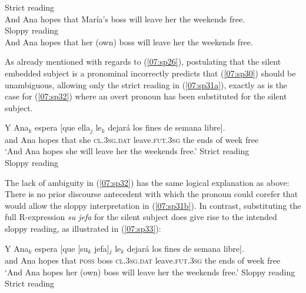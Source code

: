 \documentclass[output=paper,colorlinks,citecolor=brown,draft,draftmode]{langscibook}
\begin{document}
\ea \label{07:sp31}
\ea\label{07:sp31a}\cmark Strict reading\\
And Ana hopes that María’s boss will leave her the weekends free. \\
\ex\label{07:sp31b}\cmark Sloppy reading\\
And Ana hopes that her (own) boss will leave her the weekends free.
\z
\z

As already mentioned with regards to (\ref{07:sp26}), postulating that the silent embedded subject is a pronominal incorrectly predicts that (\ref{07:sp30}) should be unambiguous, allowing only the strict reading in (\ref{07:sp31a}), exactly as is the case for (\ref{07:sp32})  where an overt pronoun has been substituted for the silent subject.

\begin{exe}
\ex\label{07:sp32}
\gll Y Ana$_k$ espera [que ella$_j$ le$_k$ dejará los fines de semana libre].\\
and Ana hopes that she \textsc{cl.3sg.dat} leave.\textsc{fut.3sg} the ends of week free\\
\glt ‘And Ana hopes she will leave her the weekends free.’
\ea\cmark Strict reading\\
\ex\xmark Sloppy reading\\
\z
\end{exe}


\hspace*{-1mm}The lack of ambiguity in (\ref{07:sp32})  has the same logical explanation as above: There is no prior discourse antecedent with which the pronoun could corefer that would allow the sloppy interpretation in (\ref{07:sp31b}).
In contrast, substituting the full R-ex\-pres\-sion \textit{su jefa} for the silent subject does give rise to the intended sloppy reading, as illustrated in (\ref{07:sp33}):


\begin{exe}
\ex\label{07:sp33}
\gll Y Ana$_k$ espera [que [su$_k$ jefa]$_j$ le$_k$ dejará los fines de semana libre].\\
and Ana hopes that \textsc{poss} boss \textsc{cl.3sg.dat} leave.\textsc{fut.3sg} the ends of week free\\
\glt ‘And Ana hopes her (own) boss will leave her the weekends free.’
\ea\cmark Sloppy reading\\
\ex\cmark Strict reading\\
\z
\end{exe}
\end{document}
